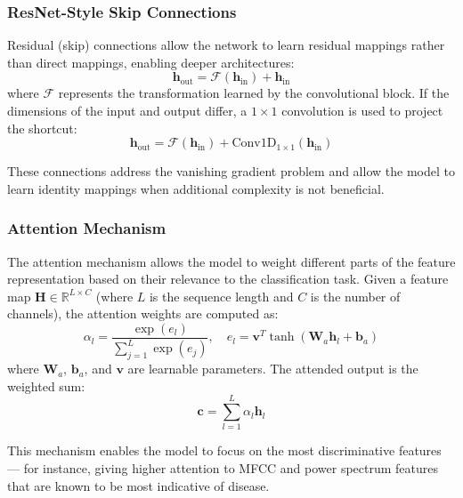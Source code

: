 \documentclass[12pt,a4paper]{report}
\begin{document}
\subsubsection{ResNet-Style Skip Connections}

Residual (skip) connections allow the network to learn residual mappings rather than direct mappings, enabling deeper architectures:
\begin{equation}
    \mathbf{h}_{\text{out}} = \mathcal{F}(\mathbf{h}_{\text{in}}) + \mathbf{h}_{\text{in}}
\end{equation}
where $\mathcal{F}$ represents the transformation learned by the convolutional block. If the dimensions of the input and output differ, a $1\times1$ convolution is used to project the shortcut:
\begin{equation}
    \mathbf{h}_{\text{out}} = \mathcal{F}(\mathbf{h}_{\text{in}}) + \text{Conv1D}_{1\times1}(\mathbf{h}_{\text{in}})
\end{equation}

These connections address the vanishing gradient problem and allow the model to learn identity mappings when additional complexity is not beneficial.

\subsubsection{Attention Mechanism}

The attention mechanism allows the model to weight different parts of the feature representation based on their relevance to the classification task. Given a feature map $\mathbf{H} \in \mathbb{R}^{L \times C}$ (where $L$ is the sequence length and $C$ is the number of channels), the attention weights are computed as:
\begin{equation}
    \alpha_l = \frac{\exp(e_l)}{\sum_{j=1}^{L} \exp(e_j)}, \quad e_l = \mathbf{v}^T \tanh(\mathbf{W}_a \mathbf{h}_l + \mathbf{b}_a)
\end{equation}
where $\mathbf{W}_a$, $\mathbf{b}_a$, and $\mathbf{v}$ are learnable parameters. The attended output is the weighted sum:
\begin{equation}
    \mathbf{c} = \sum_{l=1}^{L} \alpha_l \mathbf{h}_l
\end{equation}

This mechanism enables the model to focus on the most discriminative features --- for instance, giving higher attention to MFCC and power spectrum features that are known to be most indicative of disease.
\end{document}

